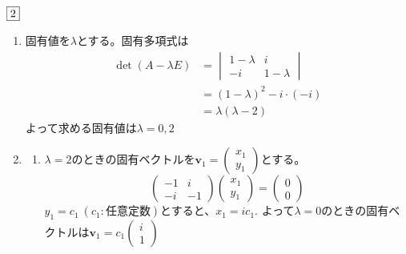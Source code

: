 \documentclass[dvipdfmx]{jsreport}
\newcounter{num}[section]
\begin{document}
\begin{answer} %
	$\fbox{2}$ 
\begin{enumerate}
	\item 固有値を$\lambda$とする。固有多項式は
\begin{align*}
	\det{(A- \lambda E)}
&= \begin{vmatrix}
	1- \lambda& i\\
	-i& 1- \lambda
\end{vmatrix}\\
&= (1- \lambda)^2- i\cdot (-i)\\
&= \lambda(\lambda- 2)
\end{align*}
	よって求める固有値は$\lambda= 0, 2$
	\item 
\begin{enumerate}
	\item $\lambda= 2$のときの固有ベクトルを$\bm{v}_1=\begin{pmatrix}x_1\\ y_1\end{pmatrix}$とする。
\begin{equation*}
	\begin{pmatrix}-1& i\\ -i& -1\end{pmatrix}\begin{pmatrix}x_1\\ y_1\end{pmatrix}= \begin{pmatrix}0\\ 0\end{pmatrix}
\end{equation*}
	$y_1= c_1\ (c_1\colon 任意定数)$とすると、$x_1= ic_1$.
	よって$\lambda= 0$のときの固有ベクトルは$\bm{v}_1= c_1\begin{pmatrix}i\\ 1\end{pmatrix}$


\end{enumerate}
\end{enumerate}
\end{answer}
\end{document}
